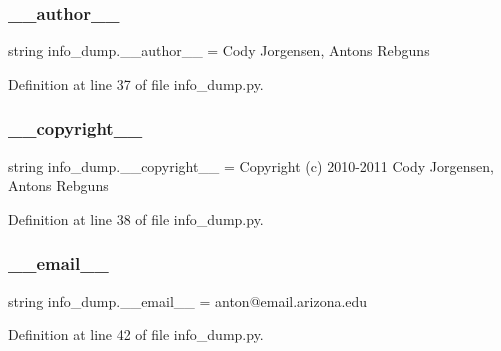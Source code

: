 \subsubsection{\texorpdfstring{\+\_\+\+\_\+author\+\_\+\+\_\+}{\_\_author\_\_}}
{\footnotesize\ttfamily string info\+\_\+dump.\+\_\+\+\_\+author\+\_\+\+\_\+ = \textquotesingle{}Cody Jorgensen, Antons Rebguns\textquotesingle{}\hspace{0.3cm}{\ttfamily [private]}}



Definition at line 37 of file info\+\_\+dump.\+py.

\mbox{\label{namespaceinfo__dump_a8af4b6f139eb532c91d84e6354cf060a}} 
\subsubsection{\texorpdfstring{\+\_\+\+\_\+copyright\+\_\+\+\_\+}{\_\_copyright\_\_}}
{\footnotesize\ttfamily string info\+\_\+dump.\+\_\+\+\_\+copyright\+\_\+\+\_\+ = \textquotesingle{}Copyright (c) 2010-\/2011 Cody Jorgensen, Antons Rebguns\textquotesingle{}\hspace{0.3cm}{\ttfamily [private]}}



Definition at line 38 of file info\+\_\+dump.\+py.

\mbox{\label{namespaceinfo__dump_aee6a55e46e487213e7bdd1d81c30dc1e}} 
\subsubsection{\texorpdfstring{\+\_\+\+\_\+email\+\_\+\+\_\+}{\_\_email\_\_}}
{\footnotesize\ttfamily string info\+\_\+dump.\+\_\+\+\_\+email\+\_\+\+\_\+ = \textquotesingle{}anton@email.\+arizona.\+edu\textquotesingle{}\hspace{0.3cm}{\ttfamily [private]}}



Definition at line 42 of file info\+\_\+dump.\+py.

